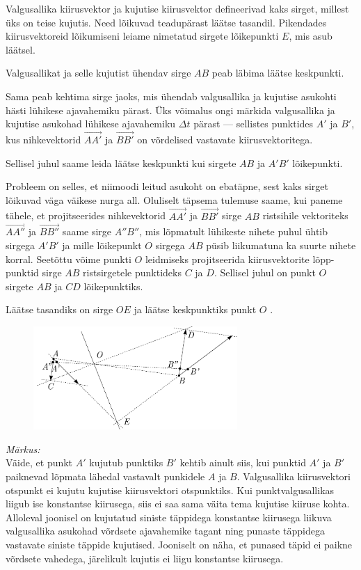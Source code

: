 \solu
Valgusallika kiirusvektor ja kujutise kiirusvektor defineerivad kaks sirget, millest üks on teise kujutis. Need lõikuvad teadupärast läätse tasandil. Pikendades kiirusvektoreid lõikumiseni leiame nimetatud sirgete lõikepunkti $E$, mis asub läätsel.  \par
Valgusallikat ja selle kujutist ühendav sirge $AB$ peab läbima läätse keskpunkti.  \par
Sama peab kehtima sirge jaoks, mis ühendab valgusallika ja kujutise asukohti hästi lühikese ajavahemiku pärast. Üks võimalus ongi märkida valgusallika ja kujutise asukohad lühikese ajavahemiku $\Delta t$ pärast --- sellistes punktides $A'$ ja $B'$, kus nihkevektorid  $\vec{AA'}$ ja $\vec{BB'}$ on võrdelised vastavate kiirusvektoritega.  \par
Sellisel juhul saame leida läätse keskpunkti kui sirgete $AB$ ja $A'B'$ lõikepunkti.  \par
Probleem on selles, et niimoodi leitud asukoht on ebatäpne, sest kaks sirget lõikuvad väga väikese nurga all. Oluliselt täpsema tulemuse saame, kui paneme tähele, et projitseerides nihkevektorid $\vec{AA'}$ ja $\vec{BB'}$ sirge $AB$ ristsihile vektoriteks $\vec{AA''}$ ja $\vec{BB''}$ saame sirge $A''B''$, mis  lõpmatult lühikeste nihete puhul ühtib sirgega $A'B'$ ja mille lõikepunkt $O$ sirgega $AB$ püsib liikumatuna ka suurte nihete korral. Seetõttu võime punkti $O$ leidmiseks projitseerida kiirusvektorite lõpp-punktid sirge $AB$ ristsirgetele punktideks $C$ ja $D$. Sellisel juhul on punkt $O$ sirgete $AB$ ja $CD$ lõikepunktiks.  \par
Läätse tasandiks on sirge $OE$ ja läätse keskpunktiks punkt $O$ .
\begin{figure}[H]
  \centering
  \includegraphics[width=0.69\textwidth]{2021-v2g-09-sol.pdf}
\end{figure}

\emph{Märkus:} \\
Väide, et punkt $A'$ kujutub punktiks $B'$ kehtib ainult siis, kui punktid $A'$ ja $B'$ paiknevad lõpmata lähedal vastavalt punkidele $A$ ja $B$. Valgusallika kiirusvektori otspunkt ei kujutu kujutise kiirusvektori otspunktiks. Kui punktvalgusallikas liigub ise konstantse kiirusega, siis ei saa sama väita tema kujutise kiiruse kohta. Alloleval joonisel on kujutatud siniste täppidega konstantse kiirusega liikuva valgusallika asukohad võrdsete ajavahemike tagant ning punaste täppidega vastavate siniste täppide kujutised. Jooniselt on näha, et punased täpid ei paikne võrdsete vahedega, järelikult kujutis ei liigu konstantse kiirusega.

